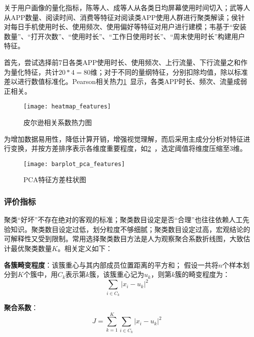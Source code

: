 \documentclass[withoutpreface,bwprint]{cumcmthesis}
\begin{document}
关于用户画像的量化指标，陈\cite{陈纯}等人、成\cite{成雪}等人从各类日均屏幕使用时间切入；武\cite{武慧娟}等人从APP数量、阅读时间、消费等特征对阅读类APP使用人群进行聚类解读；侯\cite{侯金凤}针对每日手机使用时长、使用频次、使用偏好等特征对用户进行建模；韦\cite{韦磊}基于“安装数量”、“打开次数”、“使用时长”、“工作日使用时长”、“周末使用时长”构建用户特征。

首先，尝试选择前7日各类APP使用时长、使用频次、上行流量、下行流量之和作为量化特征，共计$20*4=80$维；对于不同的量纲特征，分别扣除均值，除以标准差以进行数值标准化。Pearson相关热力\cref{fig:pearson}~显示，各类APP时长、频次、流量成弱正相关。

\begin{figure}[!htbp]
    \centering
    \texttt{[image: heatmap\_features]}
    \caption{皮尔逊相关系数热力图}
    \label{fig:pearson}
\end{figure}

为增加数据易用性，降低计算开销，增强视觉理解，而后采用主成分分析对特征进行变换，并按方差排序表示各维度重要程度，如\cref{fig:bar-pca}~，选定阈值将维度压缩至$3$维。

\begin{figure}[!htbp]
    \centering
    \texttt{[image: barplot\_pca\_features]}
    \caption{PCA特征方差柱状图}
    \label{fig:bar-pca}
\end{figure}

\subsubsection{评价指标}

聚类“好坏”不存在绝对的客观的标准\cite{机器学习}；聚类数目设定是否“合理”也往往依赖人工先验知识\cite{高维数据的聚类分析}。聚类数目设定过低，划分粒度不够细腻；聚类数目设定过高，宏观结论的可解释性又受到限制。常用选择聚类数目方法是人为观察聚合系数折线图，大致估计最优聚类数量$K$。相关定义如下：

\begin{definition}
    \textbf{各簇畸变程度}：该簇重心与其内部成员位置距离的平方和；
    假设一共将$n$个样本划分到$K$个簇中，用$C_k$表示第$k$簇，该簇重心记为$u_k$，则第$k$簇的畸变程度为：$$\sum_{i\in C_k} |x_i-u_k|^2$$
    \label{def:001}
\end{definition}

\begin{definition}
    \textbf{聚合系数}：$$J=\sum_{k=1}^{K} \sum_{i \in C_k} |x_i-u_k|^2$$
    \label{def:002}
\end{definition}
\end{document}

